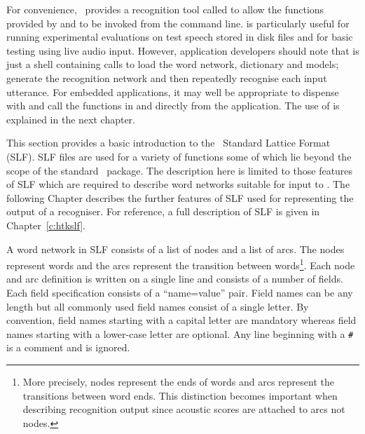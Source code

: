 For convenience, \HTK\ provides a recognition tool called 
to allow the functions provided by  and 
to be invoked from the command line.  is particularly
useful for running experimental evaluations on test speech stored
in disk files and for basic testing using live audio input.
However, application developers
should note that  is just a shell containing calls to
load the word network, dictionary and models; generate the recognition
network and then repeatedly recognise each input utterance.
For embedded applications, it may well be appropriate to
dispense with  and call the functions in 
 and  directly from the application.
The use of  is explained in the next chapter.


This section provides a basic introduction to the \HTK\ Standard Lattice
Format (SLF). SLF files are used for a variety of functions some of
which lie beyond the scope of the standard \HTK\ package.   The
description here is limited to those features of SLF which are required
to describe word networks suitable for input to .  The
following Chapter describes the further features of SLF used for
representing the output of a recogniser. For reference, a full
description of SLF is given in Chapter~\ref{c:htkslf}.

A word network in SLF consists of a list of nodes and a list of arcs.  
The nodes represent words and the arcs represent the transition between
words\footnote{More precisely, nodes represent the ends of
words and arcs represent the transitions between word ends.
This distinction becomes important when describing
recognition output since acoustic scores are attached
to arcs not nodes. }.  
Each node and arc definition is written on a single line and
consists of a number of fields. Each field specification consists of a
``name=value'' pair. Field names can be any length but all commonly used
field names consist of a single letter.  By convention, field names
starting  with a capital letter are mandatory  whereas field names
starting with a lower-case letter are optional.  Any line beginning with
a \texttt{\#} is a comment and is ignored.


